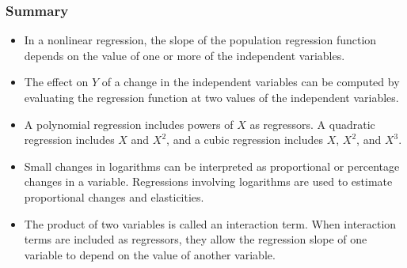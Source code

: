 

\begin{frame}
\frametitle{Summary}
\begin{itemize}
\item In a nonlinear regression, the slope of the population regression function depends on the value of one or more of the independent variables.
\item The effect on $Y$ of a change in the independent variables can be computed by evaluating the regression function at two values of the independent variables. 
\item A polynomial regression includes powers of $X$ as regressors. A quadratic regression includes $X$ and $X^{2}$, and a cubic regression includes $X$, $X^{2}$, and $X^{3}$.
\item Small changes in logarithms can be interpreted as proportional or percentage changes in a variable. Regressions involving logarithms are used to estimate proportional changes and elasticities.
\item The product of two variables is called an interaction term. When interaction terms are included as regressors, they allow the regression slope of one variable to depend on the value of another variable.
\end{itemize}
\end{frame}
